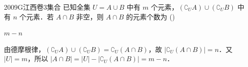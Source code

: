 
\begin{problem}{2009}{G}{江西卷}{3}{集合}
已知全集 $ U = A \cup B $ 中有 $ m $ 个元素，$ (\complement_U A) \cup (\complement_U B) $ 中有 $ n $ 个元素．若 $ A \cap B $ 非空，则 $ A \cap B $ 的元素个数为 (\hspace{1cm})
\begin{choices}
\end{choices}
\end{problem}

\begin{answer}
$ m - n $
\end{answer}

\begin{solutions}
由德摩根律，$ (\complement_U A) \cup (\complement_U B) = \complement_U (A \cap B) $，故 $ |\complement_U (A \cap B)| = n $．又 $ |U| = m $，所以 $ |A \cap B| = |U| - |\complement_U (A \cap B)| = m - n $．
\end{solutions}